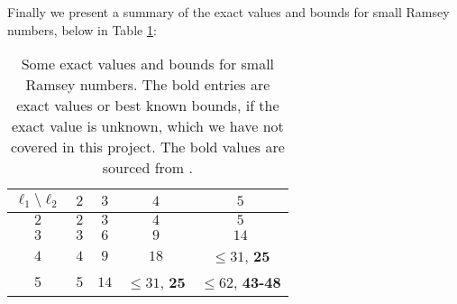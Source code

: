 Finally we present a summary of the exact values and bounds for small Ramsey numbers, below in Table \ref{tab:small_values}:
\begin{table}[H]
	\centering
	\begin{tabular} {||c|c|c|c|c||}
		\hline
		$\ell_1 \setminus \ell_{2}$ & $2$ & $3$  & $4$                     & $5$                      \\
		\hline
		$2$                         & $2$ & $3$  & $4$                     & $5$                      \\
		\hline
		$3$                         & $3$ & $6$  & $9$                     & $14$                     \\
		\hline
		$4$                         & $4$ & $9$  & $18$                    & $\leq31$, $\mathbf{25}$  \\
		\hline
		$5$                         & $5$ & $14$ & $\leq31$, $\mathbf{25}$ & $\leq62$, \textbf{43-48} \\
		\hline
	\end{tabular}
	\caption{Some exact values and bounds for small Ramsey numbers. The bold entries are exact values or best known bounds, if the exact value is unknown, which we have not covered in this project. The bold values are sourced from \cite{small_values}.}
	\label{tab:small_values}
\end{table}
